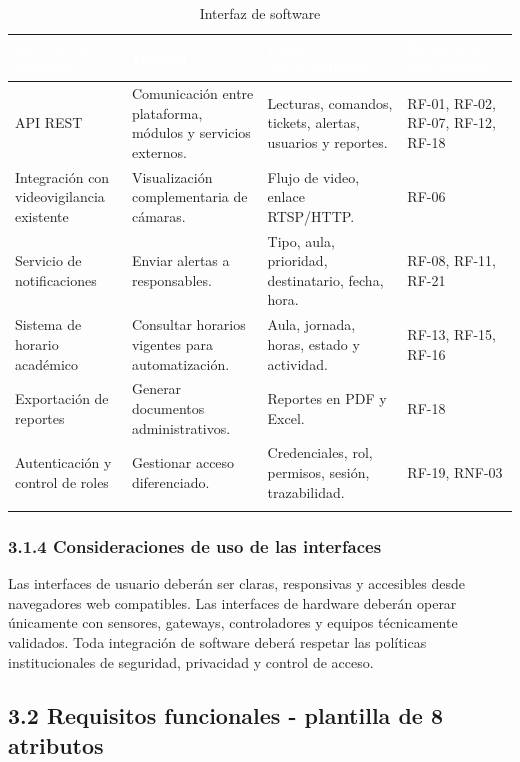\begingroup
\small
\begin{longtable}{|P{0.2500}|P{0.2500}|P{0.2500}|P{0.2500}|}
\hline
{}\textcolor{white}{\textbf{Interfaz de software}} & \textcolor{white}{\textbf{Función}} & \textcolor{white}{\textbf{Datos intercambiados}} & \textcolor{white}{\textbf{Requisitos relacionados}} \\ \hline
API REST & Comunicación entre plataforma, módulos y servicios externos. & Lecturas, comandos, tickets, alertas, usuarios y reportes. & RF-01, RF-02, RF-07, RF-12, RF-18 \\ \hline
Integración con videovigilancia existente & Visualización complementaria de cámaras. & Flujo de video, enlace RTSP/HTTP. & RF-06 \\ \hline
Servicio de notificaciones & Enviar alertas a responsables. & Tipo, aula, prioridad, destinatario, fecha, hora. & RF-08, RF-11, RF-21 \\ \hline
Sistema de horario académico & Consultar horarios vigentes para automatización. & Aula, jornada, horas, estado y actividad. & RF-13, RF-15, RF-16 \\ \hline
Exportación de reportes & Generar documentos administrativos. & Reportes en PDF y Excel. & RF-18 \\ \hline
Autenticación y control de roles & Gestionar acceso diferenciado. & Credenciales, rol, permisos, sesión, trazabilidad. & RF-19, RNF-03 \\ \hline
\caption{Interfaz de software}
\end{longtable}
\endgroup

\subsubsection*{3.1.4 Consideraciones de uso de las interfaces}


Las interfaces de usuario deberán ser claras, responsivas y accesibles desde navegadores web compatibles. Las interfaces de hardware deberán operar únicamente con sensores, gateways, controladores y equipos técnicamente validados. Toda integración de software deberá respetar las políticas institucionales de seguridad, privacidad y control de acceso.


\subsection*{3.2 Requisitos funcionales - plantilla de 8 atributos}

